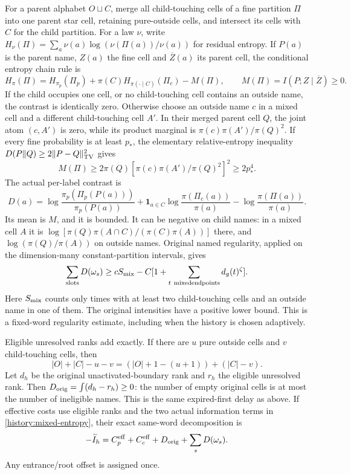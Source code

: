 For a parent alphabet $O\sqcup C$, merge all child-touching cells of a
fine partition $\Pi$ into one parent star cell, retaining pure-outside
cells, and intersect its cells with $C$ for the child partition.
For a law $\nu$, write
$H_\nu(\Pi)=\sum_a\nu(a)\log(\nu(\Pi(a))/\nu(a))$ for residual
entropy. If $P(a)$ is the parent name, $Z(a)$ the fine cell and
$\overline Z(a)$ its parent cell, the conditional entropy chain rule is
\begin{equation}
 H_\pi(\Pi)=H_{\pi_p}(\Pi_p)+\pi(C)H_{\pi(\cdot\mid C)}(\Pi_c)
                  -M(\Pi),\qquad
 M(\Pi)=I(P;Z\mid\overline Z)\ge0.
 \label{history:mixed-entropy}
\end{equation}
If the child occupies one cell, or no child-touching cell contains an
outside name, the contrast is identically zero. Otherwise choose an
outside name $c$ in a mixed cell and a different child-touching cell
$A'$. In their merged parent cell $Q$, the joint atom $(c,A')$ is
zero, while its product marginal is $\pi(c)\pi(A')/\pi(Q)^2$.
If every fine probability is at least $p_*$, the elementary
relative-entropy inequality $D(P\Vert Q)\ge2\|P-Q\|_{\rm TV}^2$
gives
\begin{equation}
 M(\Pi)\ge2\pi(Q)
       [\pi(c)\pi(A')/\pi(Q)^2]^2\ge2p_*^4.
 \label{history:mixed-gap}
\end{equation}
The actual per-label contrast is
\[
 D(a)=\log\frac{\pi_p(\Pi_p(P(a)))}{\pi_p(P(a))}
 +\mathbf1_{a\in C}\log\frac{\pi(\Pi_c(a))}{\pi(a)}
 -\log\frac{\pi(\Pi(a))}{\pi(a)}.
\]
Its mean is $M$, and it is bounded. It can be negative on child names:
in a mixed cell $A$ it is
$\log[\pi(Q)\pi(A\cap C)/(\pi(C)\pi(A))]$ there, and
$\log(\pi(Q)/\pi(A))$ on outside names. Original named regularity,
applied on the dimension-many constant-partition intervals, gives
\begin{equation}
 \sum_{\rm slots}D(\omega_s)
 \ge cS_{\rm mix}-C[1+\sum_{t\ {\rm mixed endpoints}}d_g(t)^\zeta].
 \label{history:mixed-actual}
\end{equation}
Here $S_{\rm mix}$ counts only times with at least two child-touching
cells and an outside name in one of them. The original intensities
have a positive lower bound. This is a fixed-word regularity estimate,
including when the history is chosen adaptively.

Eligible unresolved ranks add exactly. If there are $u$ pure outside
cells and $v$ child-touching cells, then
\[
 |O|+|C|-u-v=(|O|+1-(u+1))+(|C|-v).
\]
Let $d_h$ be the original unactivated-boundary rank and $r_h$ the
eligible unresolved rank. Then $D_{\rm orig}=\int(d_h-r_h)\ge0$:
the number of empty original cells is at most the number of ineligible
names. This is the same expired-first delay as above. If effective
costs use eligible ranks and the two actual information terms in
\eqref{history:mixed-entropy}, their exact same-word decomposition is
\[
 -\widetilde I_h=C_p^{\rm eff}+C_c^{\rm eff}
                  +D_{\rm orig}+\sum_sD(\omega_s).
\]
Any entrance/root offset is assigned once.

